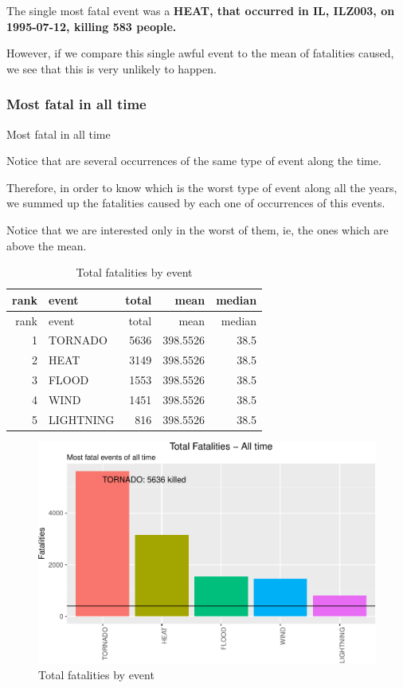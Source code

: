 \documentclass[]{article}
\begin{document}
The single most fatal event was a \textbf{HEAT, that occurred in IL,
ILZ003, on 1995-07-12, killing 583 people.}

However, if we compare this single awful event to the mean of fatalities
caused, we see that this is very unlikely to happen.

\subsubsection{Most fatal in all time}\label{most-fatal-in-all-time}

Most fatal in all time

Notice that are several occurrences of the same type of event along the
time.

Therefore, in order to know which is the worst type of event along all
the years, we summed up the fatalities caused by each one of occurrences
of this events.

Notice that we are interested only in the worst of them, ie, the ones
which are above the mean.

\begin{longtable}[]{@{}rlrrr@{}}
\caption{Total fatalities by event}\tabularnewline
\toprule
rank & event & total & mean & median\tabularnewline
\midrule
\endfirsthead
\toprule
rank & event & total & mean & median\tabularnewline
\midrule
\endhead
1 & TORNADO & 5636 & 398.5526 & 38.5\tabularnewline
2 & HEAT & 3149 & 398.5526 & 38.5\tabularnewline
3 & FLOOD & 1553 & 398.5526 & 38.5\tabularnewline
4 & WIND & 1451 & 398.5526 & 38.5\tabularnewline
5 & LIGHTNING & 816 & 398.5526 & 38.5\tabularnewline
\bottomrule
\end{longtable}

\begin{figure}[h!]
\centering
\includegraphics{readme_files/figure-latex/fatal-plot-alltime-1.pdf}
\caption{Total fatalities by event}
\end{figure}
\end{document}
